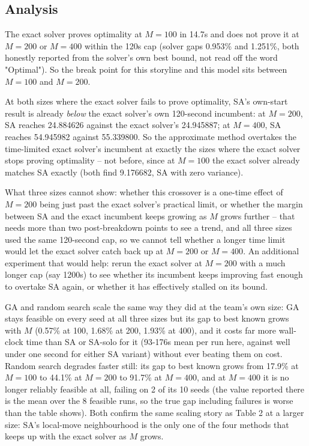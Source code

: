 \documentclass[11pt,a4paper]{article}
\begin{document}
\subsection*{Analysis}

The exact solver proves optimality at $M{=}100$ in 14.7s and does not prove it at $M{=}200$ or $M{=}400$ within the 120s cap (solver gaps 0.953\% and 1.251\%, both honestly reported from the solver's own best bound, not read off the word "Optimal"). So the break point for this storyline and this model sits between $M{=}100$ and $M{=}200$.

At both sizes where the exact solver fails to prove optimality, SA's own-start result is already \emph{below} the exact solver's own 120-second incumbent: at $M{=}200$, SA reaches 24.884626 against the exact solver's 24.945887; at $M{=}400$, SA reaches 54.945982 against 55.339800. So the approximate method overtakes the time-limited exact solver's incumbent at exactly the sizes where the exact solver stops proving optimality -- not before, since at $M{=}100$ the exact solver already matches SA exactly (both find 9.176682, SA with zero variance).

What three sizes cannot show: whether this crossover is a one-time effect of $M{=}200$ being just past the exact solver's practical limit, or whether the margin between SA and the exact incumbent keeps growing as $M$ grows further -- that needs more than two post-breakdown points to see a trend, and all three sizes used the same 120-second cap, so we cannot tell whether a longer time limit would let the exact solver catch back up at $M{=}200$ or $M{=}400$. An additional experiment that would help: rerun the exact solver at $M{=}200$ with a much longer cap (say 1200s) to see whether its incumbent keeps improving fast enough to overtake SA again, or whether it has effectively stalled on its bound.

GA and random search scale the same way they did at the team's own size: GA stays feasible on every seed at all three sizes but its gap to best known grows with $M$ (0.57\% at 100, 1.68\% at 200, 1.93\% at 400), and it costs far more wall-clock time than SA or SA-solo for it (93-176s mean per run here, against well under one second for either SA variant) without ever beating them on cost. Random search degrades faster still: its gap to best known grows from 17.9\% at $M{=}100$ to 44.1\% at $M{=}200$ to 91.7\% at $M{=}400$, and at $M{=}400$ it is no longer reliably feasible at all, failing on 2 of its 10 seeds (the value reported there is the mean over the 8 feasible runs, so the true gap including failures is worse than the table shows). Both confirm the same scaling story as Table 2 at a larger size: SA's local-move neighbourhood is the only one of the four methods that keeps up with the exact solver as $M$ grows.
\end{document}
